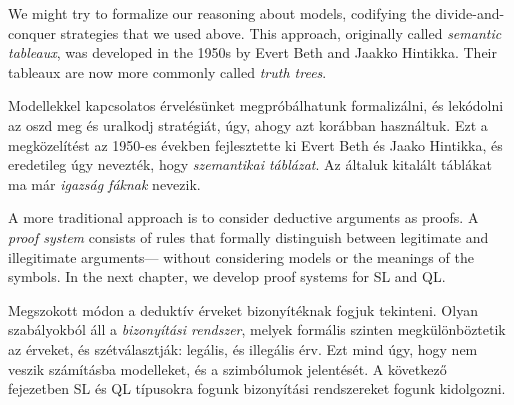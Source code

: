 We might try to formalize our reasoning about models, codifying the divide-and-conquer strategies that we used above. This approach, originally called \emph{semantic tableaux}, was developed in the 1950s by Evert Beth and Jaakko Hintikka. Their tableaux are now more commonly called \emph{truth trees}.

Modellekkel kapcsolatos érvelésünket megpróbálhatunk formalizálni, és lekódolni az oszd meg és uralkodj stratégiát, úgy, ahogy azt korábban használtuk. Ezt a megközelítést az 1950-es években fejlesztette ki Evert Beth és Jaako Hintikka, és eredetileg úgy nevezték, hogy \emph{szemantikai táblázat}. Az általuk kitalált táblákat ma már \emph{igazság fáknak} nevezik.

A more traditional approach is to consider deductive arguments as proofs. A \emph{proof system} consists of rules that formally distinguish between legitimate and illegitimate arguments--- without considering models or the meanings of the symbols. In the next chapter, we develop proof systems for SL and QL. 

Megszokott módon a deduktív érveket bizonyítéknak fogjuk tekinteni. Olyan szabályokból áll a \emph{bizonyítási rendszer}, melyek formális szinten megkülönböztetik az érveket, és szétválasztják: legális, és illegális érv. Ezt mind úgy, hogy nem veszik számításba modelleket, és a szimbólumok jelentését. A következő fejezetben SL és QL típusokra fogunk bizonyítási rendszereket fogunk kidolgozni.





